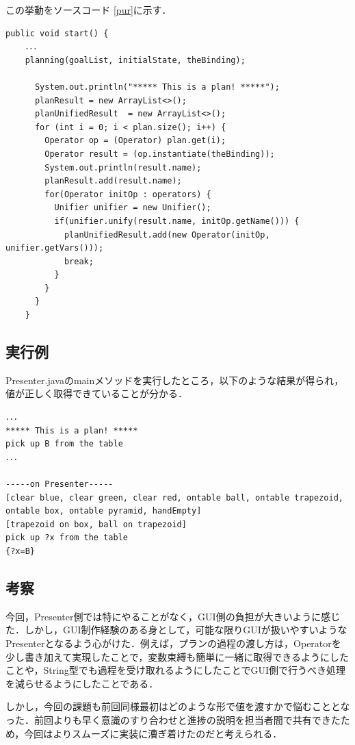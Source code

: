 \documentclass[12pt]{jarticle}
\begin{document}
この挙動をソースコード
\ref{pur}に示す．

\begin{lstlisting}[caption=Plannerクラスのstartメソッドの一部, label=pur]
  public void start() {
    ．．．
    planning(goalList, initialState, theBinding);

      System.out.println("***** This is a plan! *****");
      planResult = new ArrayList<>();
      planUnifiedResult  = new ArrayList<>();
      for (int i = 0; i < plan.size(); i++) {
        Operator op = (Operator) plan.get(i);
        Operator result = (op.instantiate(theBinding));
        System.out.println(result.name);
        planResult.add(result.name);
        for(Operator initOp : operators) {
          Unifier unifier = new Unifier();
          if(unifier.unify(result.name, initOp.getName())) {
            planUnifiedResult.add(new Operator(initOp, unifier.getVars()));
            break;
          }
        }
      }
    }
\end{lstlisting}

\subsection{実行例}
Presenter.javaのmainメソッドを実行したところ，以下のような結果が得られ，値が正しく取得できていることが分かる．

\begin{lstlisting}[caption=Presenterの実行, label=pres]
．．．
***** This is a plan! *****
pick up B from the table
．．．

-----on Presenter-----
[clear blue, clear green, clear red, ontable ball, ontable trapezoid, ontable box, ontable pyramid, handEmpty]
[trapezoid on box, ball on trapezoid]
pick up ?x from the table
{?x=B}
\end{lstlisting}

\subsection{考察}
今回，Presenter側では特にやることがなく，GUI側の負担が大きいように感じた．しかし，GUI制作経験のある身として，可能な限りGUIが扱いやすいようなPresenterとなるよう心がけた．例えば，プランの過程の渡し方は，Operatorを少し書き加えて実現したことで，変数束縛も簡単に一緒に取得できるようにしたことや，String型でも過程を受け取れるようにしたことでGUI側で行うべき処理を減らせるようにしたことである．

しかし，今回の課題も前回同様最初はどのような形で値を渡すかで悩むこととなった．前回よりも早く意識のすり合わせと進捗の説明を担当者間で共有できたため，今回はよりスムーズに実装に漕ぎ着けたのだと考えられる．
\end{document}
